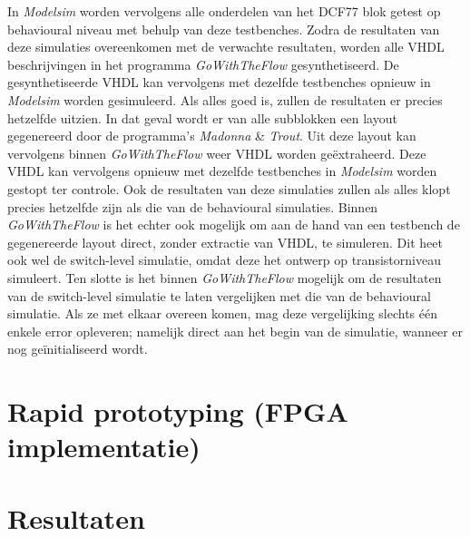 \noindent In \emph{Modelsim} worden vervolgens alle onderdelen van het DCF77 blok getest op behavioural niveau met behulp van deze testbenches. Zodra de resultaten van deze simulaties overeenkomen met de verwachte resultaten, worden alle VHDL beschrijvingen in het programma \emph{GoWithTheFlow} gesynthetiseerd. De gesynthetiseerde VHDL kan vervolgens met dezelfde testbenches opnieuw in \emph{Modelsim} worden gesimuleerd. Als alles goed is, zullen de resultaten er precies hetzelfde uitzien. In dat geval wordt er van alle subblokken een layout gegenereerd door de programma's \emph{Madonna} \& \emph{Trout}. Uit deze layout kan vervolgens binnen \emph{GoWithTheFlow} weer VHDL worden ge\"extraheerd. Deze VHDL kan vervolgens opnieuw met dezelfde testbenches in \emph{Modelsim} worden gestopt ter controle. Ook de resultaten van deze simulaties zullen als alles klopt precies hetzelfde zijn als die van de behavioural simulaties. Binnen \emph{GoWithTheFlow} is het echter ook mogelijk om aan de hand van een testbench de gegenereerde layout direct, zonder extractie van VHDL, te simuleren. Dit heet ook wel de switch-level simulatie, omdat deze het ontwerp op transistorniveau simuleert. Ten slotte is het binnen \emph{GoWithTheFlow} mogelijk om de resultaten van de switch-level simulatie te laten vergelijken met die van de behavioural simulatie. Als ze met elkaar overeen komen, mag deze vergelijking slechts \'e\'en enkele error opleveren; namelijk direct aan het begin van de simulatie, wanneer er nog ge\"initialiseerd wordt.

\section{Rapid prototyping (FPGA implementatie)}

\section{Resultaten}